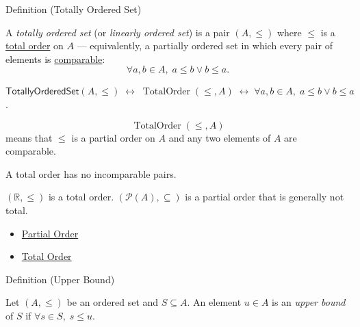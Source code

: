 \begin{definitionbox}{Definition (Totally Ordered Set)}
\begin{definition}\label{def:totally-ordered-set}
A \emph{totally ordered set} (or \emph{linearly ordered set}) is a pair
$(A,\leq)$ where $\leq$ is a \hyperref[def:total-order]{total order} on $A$ ---
equivalently, a partially ordered set in which every pair of elements is
\hyperref[def:comparable]{comparable}:
\[
\forall a,b \in A,\; a \leq b \lor b \leq a.
\]
\end{definition}
\end{definitionbox}
\begin{remark*}
$\mathsf{TotallyOrderedSet}(A,\leq)\;\leftrightarrow\;
\operatorname{TotalOrder}(\leq,A)\;\leftrightarrow\;
\forall a,b\in A,\; a\leq b\vee b\leq a$.
\end{remark*}

\begin{remark*}
\[
  \operatorname{TotalOrder}(\leq,A)
\] means that $\leq$ is a partial order on
$A$ and any two elements of $A$ are comparable.
\end{remark*}

\begin{remark*}[Interpretation]
A total order has no incomparable pairs.
\end{remark*}

\begin{remark*}[Examples]
$(\mathbb{R},\leq)$ is a total order. $(\mathcal{P}(A), \subseteq)$ is a
partial order that is generally not total.
\end{remark*}
\begin{dependencies}
\begin{itemize}
  \item \hyperref[def:partial-order]{Partial Order}
  \item \hyperref[def:total-order]{Total Order}
\end{itemize}
\end{dependencies}

\begin{definitionbox}{Definition (Upper Bound)}
\begin{definition}\label{def:upper-bound}
Let $(A,\leq)$ be an ordered set and $S \subseteq A$.
An element $u \in A$ is an \emph{upper bound} of $S$ if
$\forall s \in S,\; s \leq u$.
\end{definition}
\end{definitionbox}

